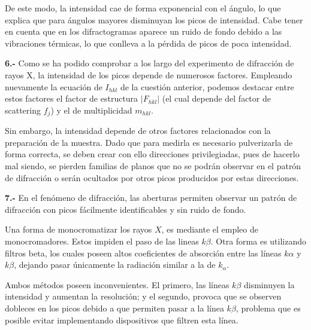 \documentclass[a4paper,twocolumn,10pt]{article}
\begin{document}
De este modo, la intensidad cae de forma exponencial con el ángulo, lo que explica que para ángulos mayores disminuyan los picos de intensidad. Cabe tener en cuenta que en los difractogramas aparece un ruido de fondo debido a las vibraciones térmicas, lo que conlleva a la pérdida de picos de poca intensidad.

\textbf{6.-} Como se ha podido comprobar a los largo del experimento de difracción de rayos X, la intensidad de los picos depende de numerosos factores. Empleando nuevamente la ecuación de $I_{hkl}$ de la cuestión anterior, podemos destacar entre estos factores el factor de estructura $|F_{hkl}|$ (el cual depende del factor de scattering $f_j$) y el de multiplicidad $m_{hkl}$.

Sin embargo, la intensidad depende de otros factores relacionados con la preparación de la muestra. Dado que para medirla es necesario pulverizarla de forma correcta, se deben crear con ello direcciones privilegiadas, pues de hacerlo mal siendo, se pierden familias de planos que no se podrán observar en el patrón de difracción o serán ocultados por otros picos producidos por estas direcciones.

\textbf{7.-} En el fenómeno de difracción, las aberturas permiten observar un patrón de difracción con picos fácilmente identificables y sin ruido de fondo.

Una forma de monocromatizar los rayos $X$, es mediante el empleo de monocromadores. Estos impiden el paso de las lineas $k\beta$. Otra forma es utilizando filtros beta, los cuales poseen altos coeficientes de absorción entre las líneas $k\alpha$ y $k\beta$, dejando pasar únicamente la radiación similar a la de $k_{\alpha}$. 

Ambos métodos poseen inconvenientes. El primero, las líneas $k\beta$ disminuyen la intensidad y aumentan la resolución; y el segundo, provoca que se observen dobleces en los picos debido a que permiten pasar a la línea $k\beta$, problema que es posible evitar implementando dispositivos que filtren esta línea.
\end{document}
